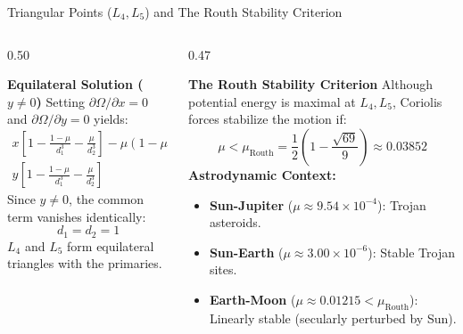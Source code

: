 \documentclass[aspectratio=169, 10pt]{beamer}
\begin{document}
\begin{frame}{Triangular Points ($L_4, L_5$) and The Routh Stability Criterion}
    \begin{columns}[t]
        \begin{column}{0.50\textwidth}
            \begin{block}{\textbf{Equilateral Solution ($y \neq 0$)}}
                \scriptsize
                Setting $\partial\Omega/\partial x = 0$ and $\partial\Omega/\partial y = 0$ yields:
                \begin{align*}
                    x\left[1 - \frac{1-\mu}{d_1^3} - \frac{\mu}{d_2^3}\right] - \mu(1-\mu)\left[\frac{1}{d_1^3} - \frac{1}{d_2^3}\right] &= 0 \\
                    y\left[1 - \frac{1-\mu}{d_1^3} - \frac{\mu}{d_2^3}\right] &= 0
                \end{align*}
                Since $y \neq 0$, the common term vanishes identically:
                \begin{equation*}
                    d_1 = d_2 = 1
                \end{equation*}
                $L_4$ and $L_5$ form equilateral triangles with the primaries.
            \end{block}
        \end{column}
        
        \begin{column}{0.47\textwidth}
            \begin{block}{\textbf{The Routh Stability Criterion}}
                \scriptsize
                Although potential energy is maximal at $L_4, L_5$, Coriolis forces stabilize the motion if:
                \begin{equation*}
                    \mu < \mu_{\text{Routh}} = \frac{1}{2}\left(1 - \frac{\sqrt{69}}{9}\right) \approx 0.03852
                \end{equation*}
                \textbf{Astrodynamic Context:}
                \begin{itemize}\setlength{\itemsep}{1.5pt}
                    \item \textbf{Sun-Jupiter} ($\mu \approx 9.54 \times 10^{-4}$): Trojan asteroids.
                    \item \textbf{Sun-Earth} ($\mu \approx 3.00 \times 10^{-6}$): Stable Trojan sites.
                    \item \textbf{Earth-Moon} ($\mu \approx 0.01215 < \mu_{\text{Routh}}$): Linearly stable (secularly perturbed by Sun).
                \end{itemize}
            \end{block}
        \end{column}
    \end{columns}
\end{frame}
\end{document}
